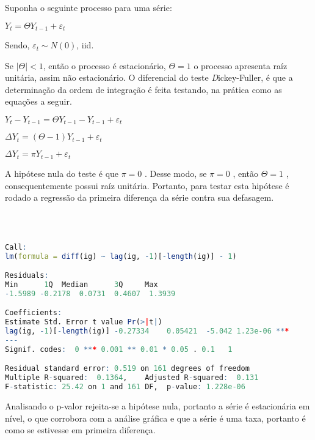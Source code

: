 \documentclass[a4paper,12pt,oneside,titlepage]{article}
\begin{document}
Suponha o seguinte processo para uma série:
\begin{center}
	
$ Y_t = \varTheta Y_{t-1} + \varepsilon_t  $	
	
\end{center}

Sendo, $ \varepsilon_t \sim N(0) $, iid.


Se $ |\varTheta| < 1 $, então o processo é estacionário, $\varTheta  = 1 $ o processo
apresenta raíz unitária, assim não estacionário. O diferencial do teste
\textit Dickey-Fuller, é que a determinação da ordem de integração é feita
testando, na prática como as equações a seguir.

\begin{center}

$ Y_t - Y_{t-1} = \varTheta Y_{t-1} - Y_{t-1} + \varepsilon_t $

$ \varDelta Y_t  = (\varTheta - 1) Y_{t-1}  + \varepsilon_t $

$ \varDelta Y_t  = \pi Y_{t-1}  + \varepsilon_t $

\end{center}


A hipótese nula do teste é que $ \pi = 0 $  . Desse modo, se  $ \pi = 0 $  , então $
\varTheta  = 1 $  ,  consequentemente  possui raíz unitária. Portanto, para testar esta hipótese é rodado a regressão da primeira diferença da série contra
sua defasagem.



\begin{lstlisting}[language=R,caption={DF}]



Call:
lm(formula = diff(ig) ~ lag(ig, -1)[-length(ig)] - 1)

Residuals:
Min      1Q  Median      3Q     Max 
-1.5989 -0.2178  0.0731  0.4607  1.3939 

Coefficients:
Estimate Std. Error t value Pr(>|t|)    
lag(ig, -1)[-length(ig)] -0.27334    0.05421  -5.042 1.23e-06 ***
---
Signif. codes:  0 *** 0.001 ** 0.01 * 0.05 . 0.1   1

Residual standard error: 0.519 on 161 degrees of freedom
Multiple R-squared:  0.1364,	Adjusted R-squared:  0.131 
F-statistic: 25.42 on 1 and 161 DF,  p-value: 1.228e-06


\end{lstlisting}



Analisando o p-valor rejeita-se a hipótese nula, portanto a série é
estacionária em nível, o que corrobora com a análise gráfica e que a
série é uma taxa, portanto é como se estivesse em primeira diferença.
\end{document}
